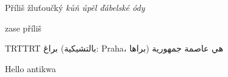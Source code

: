 \documentclass{article}
\newenvironment{arab}{\pardir TRT\textdir TRT\amiri}{}
\begin{document}
Příliš žluťoučký \textit{kůň úpěl ďábelské ódy}

\pokus zase příliš

\begin{arab}
براغ (بالتشيكية: Praha، براها) هي عاصمة جمهورية %
\end{arab}

\apcregular Hello antikwa
\end{document}
